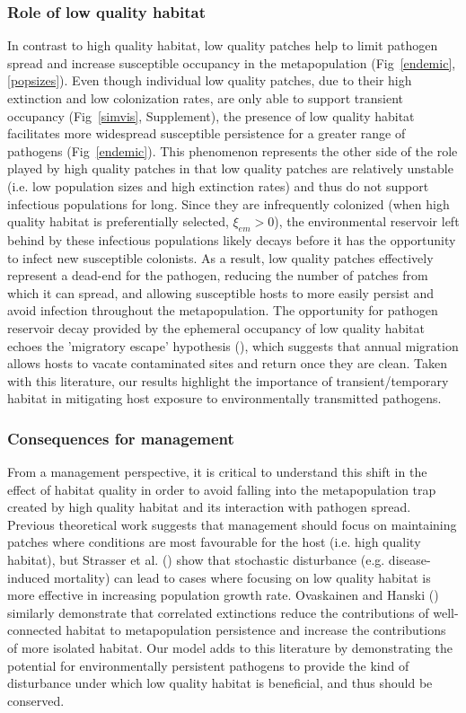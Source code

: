 \documentclass{article}
\begin{document}
\subsubsection*{Role of low quality habitat}

In contrast to high quality habitat, low quality patches help to limit pathogen spread and increase susceptible occupancy in the metapopulation (Fig~\ref{endemic}, \ref{popsizes}). 
Even though individual low quality patches, due to their high extinction and low colonization rates, are only able to support transient occupancy (Fig~\ref{simvis}, Supplement), the presence of low quality habitat facilitates more widespread susceptible persistence for a greater range of pathogens (Fig~\ref{endemic}).  
This phenomenon represents the other side of the role played by high quality patches in that low quality patches are relatively unstable (i.e. low population sizes and high extinction rates) and thus do not support infectious populations for long.
Since they are infrequently colonized (when high quality habitat is preferentially selected, $\xi_{em} > 0$), the environmental reservoir left behind by these infectious populations likely decays before it has the opportunity to infect new susceptible colonists. 
As a result, low quality patches effectively represent a dead-end for the pathogen, reducing the number of patches from which it can spread, and allowing susceptible hosts to more easily persist and avoid infection throughout the metapopulation.
The opportunity for pathogen reservoir decay provided by the ephemeral occupancy of low quality habitat echoes the 'migratory escape' hypothesis (\cite{Loehle1995}), which suggests that annual migration allows hosts to vacate contaminated sites and return once they are clean.
Taken with this literature, our results highlight the importance of transient/temporary habitat in mitigating host exposure to environmentally transmitted pathogens.

\subsubsection*{Consequences for management}

From a management perspective, it is critical to understand this shift in the effect of habitat quality in order to avoid falling into the metapopulation trap created by high quality habitat and its interaction with pathogen spread.
Previous theoretical work suggests that management should focus on maintaining patches where conditions are most favourable for the host (i.e. high quality habitat), but Strasser et al. (\cite{Strasser2010}) show that stochastic disturbance (e.g. disease-induced mortality) can lead to cases where focusing on low quality habitat is more effective in increasing population growth rate.
Ovaskainen and Hanski (\cite{Ovaskainen2003a}) similarly demonstrate that correlated extinctions reduce the contributions of well-connected habitat to metapopulation persistence and increase the contributions of more isolated habitat.
Our model adds to this literature by demonstrating the potential for environmentally persistent pathogens to provide the kind of disturbance under which low quality habitat is beneficial, and thus should be conserved.
\end{document}
